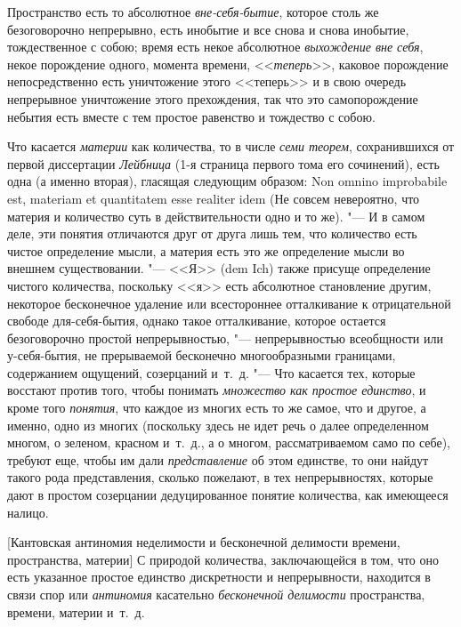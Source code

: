 Пространство есть то абсолютное {\em вне-себя-бытие},
которое столь же безоговорочно непрерывно, есть инобытие и все снова и
снова инобытие, тождественное с собою; время есть некое абсолютное
{\em выхождение вне себя}, некое порождение одного,
момента времени, <<{\em теперь}>>, каковое порождение
непосредственно есть уничтожение этого <<теперь>> и в свою очередь
непрерывное уничтожение этого прехождения, так что это самопорождение
небытия есть вместе с тем простое равенство и тождество с собою.

Что касается {\em материи} как количества, то в числе
{\em семи теорем}, сохранившихся от первой диссертации {\em Лейбница} (1-я страница первого тома его
сочинений), есть одна (а именно вторая), гласящая следующим образом: Non
omnino improbabile est, materiam et quantitatem esse realiter idem
(Не совсем невероятно, что материя и количество суть в действительности
одно и то же). "--- И в самом деле, эти понятия отличаются друг от друга лишь
тем, что количество есть чистое определение мысли, а материя есть это же
определение мысли во внешнем существовании. "--- <<Я>> (dem Ich) также присуще
определение чистого количества, поскольку <<я>> есть абсолютное становление
другим, некоторое бесконечное удаление или всестороннее отталкивание к
отрицательной свободе для-себя-бытия, однако такое отталкивание, которое
остается безоговорочно простой непрерывностью, "--- непрерывностью всеобщности
или у-себя-бытия, не прерываемой бесконечно многообразными границами,
содержанием ощущений, созерцаний и~т.~д. "--- Что касается тех, которые
восстают против того, чтобы понимать {\em множество как
простое единство}, и кроме того {\em понятия}, что
каждое из многих есть то же самое, что и другое, а именно, одно из многих
(поскольку здесь не идет речь о далее определенном многом, о зеленом,
красном и~т.~д., а о многом, рассматриваемом само по себе), требуют еще,
чтобы им дали {\em представление} об этом единстве, то
они найдут такого рода представления, сколько пожелают, в тех
непрерывностях, которые дают в простом созерцании дедуцированное понятие
количества, как имеющееся налицо.

%
  {[Кантовская антиномия неделимости и бесконечной делимости времени, пространства, материи]}
\label{bkm:bm88a}
С природой количества, заключающейся в том, что оно есть указанное простое
единство дискретности и непрерывности, находится в связи спор или
{\em антиномия} касательно {\em бесконечной делимости} пространства,
времени, материи и~т.~д.

